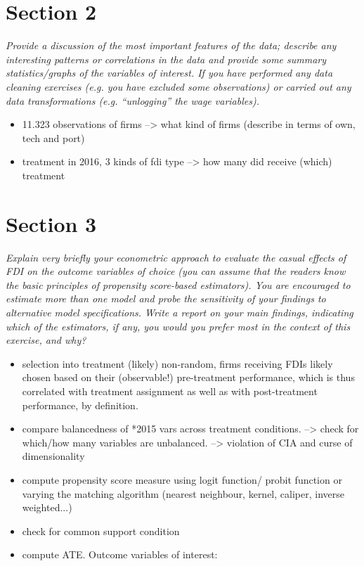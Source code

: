 \documentclass[11pt,a4paper,leqno]{article}
\begin{document}
\section*{Section 2}
\textit{Provide a discussion of the most important features of the data; describe any interesting patterns or correlations in the data and provide some summary statistics/graphs of the variables of interest. If you have performed any data cleaning exercises (e.g. you have excluded some observations) or carried out any data transformations (e.g. “unlogging” the wage variables).}

\begin{itemize}
	\item 11.323 observations of firms --> what kind of firms (describe in terms of own, tech and port)
	\item treatment in 2016, 3 kinds of fdi type --> how many did receive (which) treatment

\end{itemize}

\section*{Section 3}
\textit{Explain very briefly your econometric approach to evaluate the casual effects of FDI on the outcome variables of choice (you can assume that the readers know the basic principles of propensity score-based estimators). You are encouraged to estimate more than one model and probe the sensitivity of your findings to alternative model specifications. Write a report on your main findings, indicating which of the estimators, if any, you would you prefer most in the context of this exercise, and why?}

\begin{itemize}
	\item selection into treatment (likely) non-random, firms receiving FDIs likely chosen based on their (observable!) pre-treatment performance, which is thus correlated with treatment assignment as well as with post-treatment performance, by definition. 
	\item compare balancedness of *2015 vars across treatment conditions.  --> check for which/how many variables are unbalanced.
	--> violation of CIA and curse of dimensionality  
	\item compute propensity score measure using logit function/ probit function or varying the matching algorithm (nearest neighbour, kernel, caliper, inverse weighted...)
	\item check for common support condition
	\item compute ATE. Outcome variables of interest: 
\end{itemize}
\end{document}

